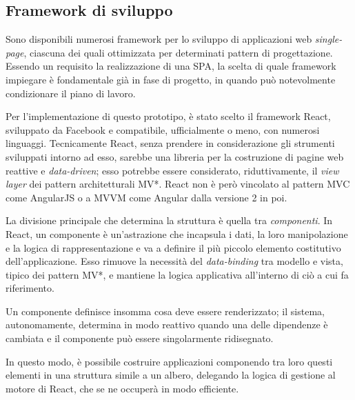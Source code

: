     \subsection{Framework di sviluppo}\label{subsec:react}

      Sono disponibili numerosi framework per lo sviluppo di applicazioni web \emph{single-page}, ciascuna dei quali ottimizzata per determinati pattern di progettazione.
      Essendo un requisito la realizzazione di una SPA, la scelta di quale framework impiegare è fondamentale già in fase di progetto, in quando può notevolmente condizionare il piano di lavoro.

      Per l'implementazione di questo prototipo, è stato scelto il framework React, sviluppato da Facebook e compatibile, ufficialmente o meno, con numerosi linguaggi.
      Tecnicamente React, senza prendere in considerazione gli strumenti sviluppati intorno ad esso, sarebbe una libreria per la costruzione di pagine web reattive e \emph{data-driven};
      esso potrebbe essere considerato, riduttivamente, il \emph{view layer} dei pattern architetturali MV*.
      React non è però vincolato al pattern MVC come AngularJS o a MVVM come Angular dalla versione 2 in poi.


      La divisione principale che determina la struttura è quella tra \emph{componenti}.
      In React, un componente è un'astrazione che incapsula i dati, la loro manipolazione e la logica di rappresentazione e va a definire il più piccolo elemento costitutivo dell'applicazione.
      Esso rimuove la necessità del \emph{data-binding} tra modello e vista, tipico dei pattern MV*, e mantiene la logica applicativa all'interno di ciò a cui fa riferimento.

      Un componente definisce insomma cosa deve essere renderizzato;
      il sistema, autonomamente, determina in modo reattivo quando una delle dipendenze è cambiata e il componente può essere singolarmente ridisegnato.

      In questo modo, è possibile costruire applicazioni componendo tra loro questi elementi in una struttura simile a un albero, delegando la logica di gestione al motore di React, che se ne occuperà in modo efficiente.

